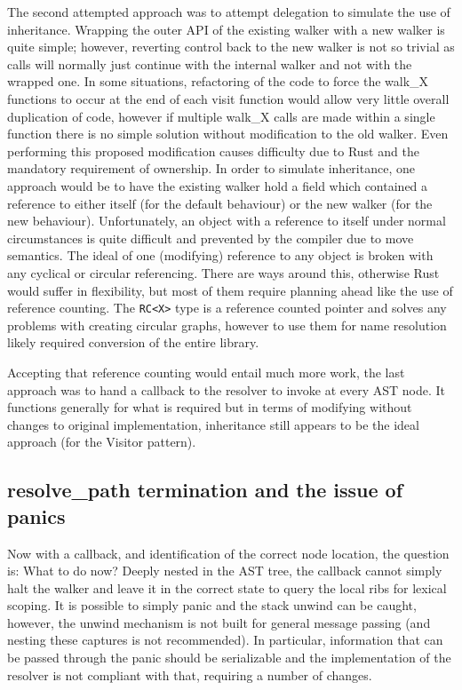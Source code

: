The second attempted approach was to attempt delegation to simulate the use of inheritance. Wrapping the outer API of the existing walker with a new walker is quite simple; however, reverting control back to the new walker is not so trivial as calls will normally just continue with the internal walker and not with the wrapped one. In some situations, refactoring of the code to force the walk\_X functions to occur at the end of each visit function would allow very little overall duplication of code, however if multiple walk\_X calls are made within a single function there is no simple solution without modification to the old walker. Even performing this proposed modification causes difficulty due to Rust and the mandatory requirement of ownership. In order to simulate inheritance, one approach would be to have the existing walker hold a field which contained a reference to either itself (for the default behaviour) or the new walker (for the new behaviour). Unfortunately, an object with a reference to itself under normal circumstances is quite difficult and prevented by the compiler due to move semantics. The ideal of one (modifying) reference to any object is broken with any cyclical or circular referencing. There are ways around this, otherwise Rust would suffer in flexibility, but most of them require planning ahead like the use of reference counting. The {\verb|RC<X>|} type is a reference counted pointer and solves any problems with creating circular graphs, however to use them for name resolution likely required conversion of the entire library.

Accepting that reference counting would entail much more work, the last approach was to hand a callback to the resolver to invoke at every AST node. It functions generally for what is required but in terms of modifying without changes to original implementation, inheritance still appears to be the ideal approach (for the Visitor pattern).

\subsection{resolve\_path termination and the issue of panics}
Now with a callback, and identification of the correct node location, the question is: What to do now? Deeply nested in the AST tree, the callback cannot simply halt the walker and leave it in the correct state to query the local ribs for lexical scoping. It is possible to simply panic and the stack unwind can be caught, however, the unwind mechanism is not built for general message passing (and nesting these captures is not recommended). In particular, information that can be passed through the panic should be serializable and the implementation of the resolver is not compliant with that, requiring a number of changes.

